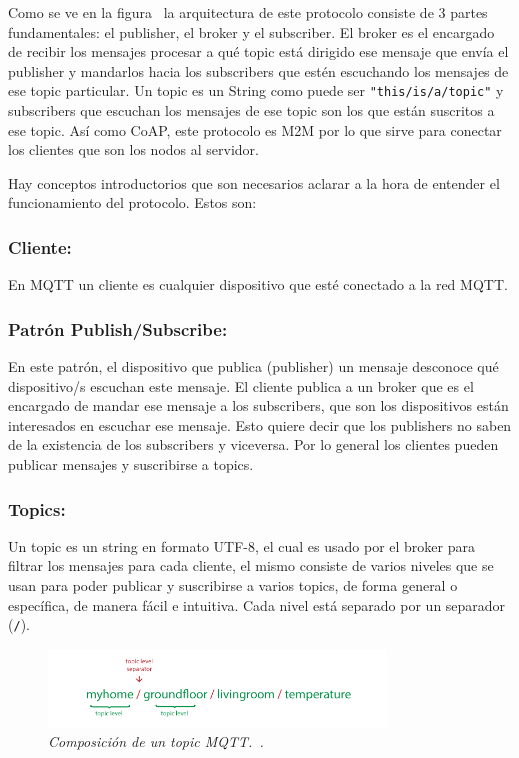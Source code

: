 Como se ve en la figura~ la arquitectura de este protocolo consiste de 3 partes fundamentales: el publisher, el broker y el subscriber. El broker es el encargado de recibir los mensajes procesar a qué topic está dirigido ese mensaje que envía el publisher y mandarlos hacia los subscribers que estén escuchando los mensajes de ese topic particular. Un topic es un String como puede ser \lstinline[columns=fixed]{"this/is/a/topic"} y subscribers que escuchan los mensajes de ese topic son los que están suscritos a ese topic. Así como CoAP, este protocolo es M2M por lo que sirve para conectar los clientes que son los nodos al servidor.

Hay conceptos introductorios que son necesarios aclarar a la hora de entender el funcionamiento del protocolo. Estos son:

\subsubsection{Cliente:}

En MQTT un cliente es cualquier dispositivo que esté conectado a la red MQTT. 

\subsubsection{Patrón Publish/Subscribe:}

En este patrón, el dispositivo que publica (publisher) un mensaje desconoce qué dispositivo/s escuchan este mensaje. El cliente publica a un broker que es el encargado de mandar ese mensaje a los subscribers, que son los  dispositivos están interesados en escuchar ese mensaje. Esto quiere decir que los publishers no saben de la existencia de los subscribers y viceversa. Por lo general los clientes pueden publicar mensajes y suscribirse a topics. 

\subsubsection{Topics:}
Un topic es un string en formato UTF-8, el cual es usado por el broker para filtrar los mensajes para cada cliente, el mismo consiste de varios niveles que se usan para poder publicar y suscribirse a varios topics, de forma general o específica, de manera fácil e intuitiva. Cada nivel está separado por un separador (\lstinline[columns=fixed]{/}). 

\begin{figure}[h!]
  \centering
  \includegraphics[width=0.8\textwidth, keepaspectratio]{images/topic-basics}
  \caption{\textit{Composición de un topic MQTT.~\cite{MQTTEssentials5}.}}
  \label{fig:topic-basics}
\end{figure}

